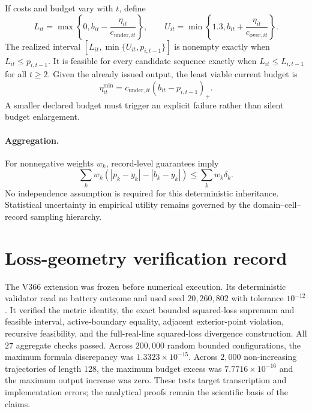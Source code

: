 \documentclass[11pt]{article}
\begin{document}
If costs and budget vary with \(t\), define
\[
 L_{it}=\max\!\left\{0,b_{it}-\frac{\eta_{it}}{c_{\mathrm{under},it}}\right\},
 \qquad
 U_{it}=\min\!\left\{1.3,b_{it}+\frac{\eta_{it}}{c_{\mathrm{over},it}}\right\}.
\]
The realized interval \([L_{it},\min\{U_{it},p_{i,t-1}\}]\) is nonempty exactly when \(L_{it}\leq p_{i,t-1}\). It is feasible for every candidate sequence exactly when \(L_{it}\leq L_{i,t-1}\) for all \(t\geq2\). Given the already issued output, the least viable current budget is
\begin{equation}
 \eta^{\min}_{it}
 =c_{\mathrm{under},it}(b_{it}-p_{i,t-1})_+.
 \label{eq:supp_minimum_viable_budget}
\end{equation}
A smaller declared budget must trigger an explicit failure rather than silent budget enlargement.

\paragraph{Aggregation.}
For nonnegative weights \(w_k\), record-level guarantees imply
\[
 \sum_k w_k(|p_k-y_k|-|b_k-y_k|)
 \leq\sum_k w_k\delta_k.
\]
No independence assumption is required for this deterministic inheritance. Statistical uncertainty in empirical utility remains governed by the domain--cell--record sampling hierarchy.

\section{Loss-geometry verification record}

The V366 extension was frozen before numerical execution. Its deterministic validator read no battery outcome and used seed $20{,}260{,}802$ with tolerance $10^{-12}$. It verified the metric identity, the exact bounded squared-loss supremum and feasible interval, active-boundary equality, adjacent exterior-point violation, recursive feasibility, and the full-real-line squared-loss divergence construction. All $27$ aggregate checks passed. Across $200{,}000$ random bounded configurations, the maximum formula discrepancy was $1.3323\times10^{-15}$. Across $2{,}000$ non-increasing trajectories of length $128$, the maximum budget excess was $7.7716\times10^{-16}$ and the maximum output increase was zero. These tests target transcription and implementation errors; the analytical proofs remain the scientific basis of the claims.
\end{document}
